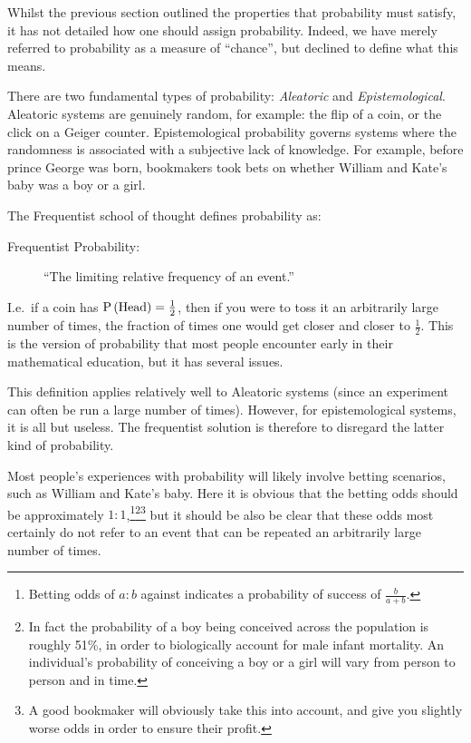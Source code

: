 Whilst the previous section outlined the properties that probability must satisfy, it has not detailed how one should assign probability. Indeed, we have merely referred to probability as a measure of ``chance'', but declined to define what this means.

There are two fundamental types of probability: {\em Aleatoric\/} and {\em Epistemological}. Aleatoric systems are genuinely random, for example: the flip of a coin, or the click on a Geiger counter. Epistemological probability governs systems where the randomness is associated with a subjective lack of knowledge. For example, before prince George was born, bookmakers took bets on whether William and Kate's baby was a boy or a girl. 

The Frequentist school of thought defines probability as:
\begin{description}
  \item[Frequentist Probability:]``The limiting relative frequency of an event.''
\end{description}
I.e.\ if a coin has $\mathrm{P}\left(\mathrm{Head}\right)=\frac{1}{2}$, then if you were to toss it an arbitrarily large number of times, the fraction of times one would get closer and closer to $\frac{1}{2}$. This is the version of probability that most people encounter early in their mathematical education, but it has several issues.

This definition applies relatively well to Aleatoric systems (since an experiment can often be run a large number of times). However, for epistemological systems, it is all but useless. The frequentist solution is therefore to disregard the latter kind of probability.

Most people's experiences with probability will likely involve betting scenarios, such as William and Kate's baby. Here it is obvious that the betting odds should be approximately $1:1$,\footnote{Betting odds of $a:b$ against indicates a probability of success of $\frac{b}{a+b}$.}\footnote{In fact the probability of a boy being conceived across the population is roughly 51\%, in order to biologically account for male infant mortality. An individual's probability of conceiving a boy or a girl will vary from person to person and in time.}\footnote{A good bookmaker will obviously take this into account, and give you slightly worse odds in order to ensure their profit.} but it should be also be clear that these odds most certainly do not refer to an event that can be repeated an arbitrarily large number of times.

